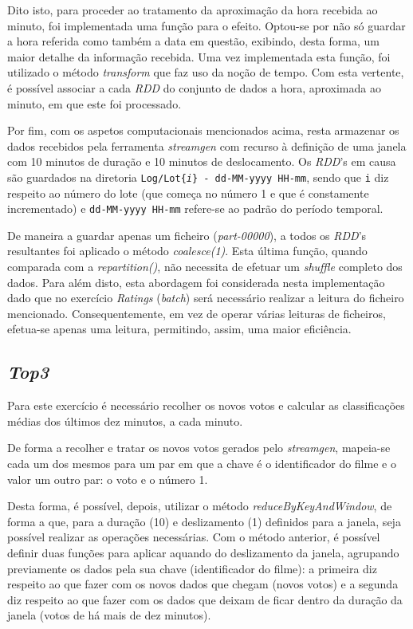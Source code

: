 \documentclass[a4paper]{report}
\begin{document}
            Dito isto, para proceder ao tratamento da aproximação da hora recebida ao minuto, foi implementada uma função para o efeito. Optou-se por não só guardar a hora referida como também a data em questão, exibindo, desta forma, um maior detalhe da informação recebida.
            Uma vez implementada esta função, foi utilizado o método \textit{transform} que faz uso da noção de tempo. Com esta vertente, é possível associar a cada \textit{RDD} do conjunto de dados a hora, aproximada ao minuto, em que este foi processado.

            Por fim, com os aspetos computacionais mencionados acima, resta armazenar os dados recebidos pela ferramenta \textit{streamgen} com recurso à definição de uma janela com 10 minutos de duração e 10 minutos de deslocamento.
            Os \textit{RDD}'s em causa são guardados na diretoria \texttt{Log/Lot\{\textit{i}\} - dd-MM-yyyy HH-mm}, sendo que \texttt{i} diz respeito ao número do lote (que começa no número 1 e que é constamente incrementado) e \texttt{dd-MM-yyyy HH-mm} refere-se ao padrão do período temporal.
            
            De maneira a guardar apenas um ficheiro (\textit{part-00000}), a todos os \textit{RDD}'s resultantes foi aplicado o método \textit{coalesce(1)}.
            Esta última função, quando comparada com a \textit{repartition()}, não necessita de efetuar um \textit{shuffle} completo dos dados.
            Para além disto, esta abordagem foi considerada nesta implementação dado que no exercício \textit{Ratings} (\textit{batch}) será necessário realizar a leitura do ficheiro mencionado. 
            Consequentemente, em vez de operar várias leituras de ficheiros, efetua-se apenas uma leitura, permitindo, assim, uma maior eficiência.

        \subsection{\textit{Top3}} \label{subsec:Task1-Top3}
            Para este exercício é necessário recolher os novos votos e calcular as classificações médias dos últimos dez minutos, a cada minuto.

            De forma a recolher e tratar os novos votos gerados pelo \textit{streamgen}, mapeia-se cada um dos mesmos para um par em que a chave é o identificador do filme e o valor um outro par: o voto e o número 1.
            
            Desta forma, é possível, depois, utilizar o método \textit{reduceByKeyAndWindow}, de forma a que, para a duração (10) e deslizamento (1) definidos para a janela, seja possível realizar as operações necessárias.
            Com o método anterior, é possível definir duas funções para aplicar aquando do deslizamento da janela, agrupando previamente os dados pela sua chave (identificador do filme): a primeira diz respeito ao que fazer com os novos dados que chegam (novos votos) e a segunda diz respeito ao que fazer com os dados que deixam de ficar dentro da duração da janela (votos de há mais de dez minutos).
            
\end{document}
